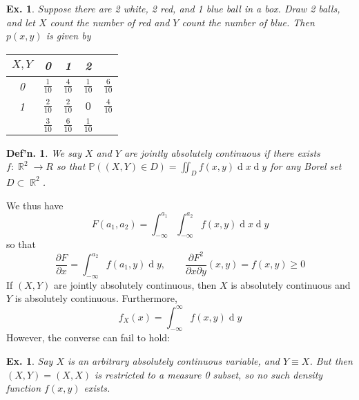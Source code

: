 \documentclass[12pt, a4paper]{book}
\DeclareMathOperator{\R}{\mathbb{R}}
\renewcommand{\Pr}{\mathbb{P}}
\renewcommand{\d}[1]{\ensuremath{\operatorname{d}\!{#1}}} %
\newtheorem{definition}[theorem]{Def'n.}
\newtheorem{example}[theorem]{Ex.}
\theoremstyle{nonumberplain}
\begin{document}
\begin{example}
    Suppose there are 2 white, 2 red, and 1 blue ball in a box.
    Draw 2 balls, and let $X$ count the number of red and $Y$ count the number of blue.
    Then $p(x,y)$ is given by
    \begin{center}
        \begin{tabular}{c|c|c|c|c}
            $X,Y$&0&1&2\\
            \hline
            0&$\frac{1}{10}$&$\frac{4}{10}$&$\frac{1}{10}$&$\frac{6}{10}$\\
            \hline
            1&$\frac{2}{10}$&$\frac{2}{10}$&$0$&$\frac{4}{10}$\\
            \hline
            &$\frac{3}{10}$&$\frac{6}{10}$&$\frac{1}{10}$&
        \end{tabular}
    \end{center}
\end{example}
\begin{definition}
    We say $X$ and $Y$ are jointly absolutely continuous if there exists $f:\R^2\to R$ so that $\Pr((X,Y)\in D)=\iint_D f(x,y)\d{x}\d{y}$ for any Borel set $D\subset\R^2$.
\end{definition}
We thus have
\[F(a_1,a_2)=\int_{-\infty}^{a_1}\int_{-\infty}^{a_2}f(x,y)\d{x}\d{y}\]
so that
\[\frac{\partial F}{\partial x}=\int_{-\infty}^{a_2}f(a_1,y)\d{y},\qquad\frac{\partial F^2}{\partial x\partial y}(x,y)=f(x,y)\geq 0\]
If $(X,Y)$ are jointly absolutely continuous, then $X$ is absolutely continuous and $Y$ is absolutely continuous.
Furthermore,
\[f_X(x)=\int_{-\infty}^\infty f(x,y)\d{y}\]
However, the converse can fail to hold:
\begin{example}
    Say $X$ is an arbitrary absolutely continuous variable, and $Y\equiv X$.
    But then $(X,Y)=(X,X)$ is restricted to a measure 0 subset, so no such density function $f(x,y)$ exists.
\end{example}
\end{document}
